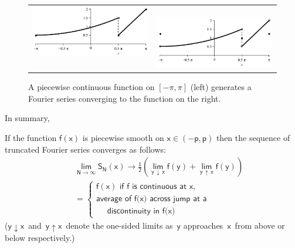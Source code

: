 \documentclass[12pt]{article}
\numberwithin{equation}{section}
\newenvironment{Framed}
  	{\begin{framed}
  		}
  	{\end{framed}}
\begin{document}
\begin{figure}[H]
\centering
\begin{tabular}{cc}
\includegraphics[scale=0.35]{Figs/cgence1.jpg}~~&~~\includegraphics[scale=0.35]{Figs/cgence2.jpg}
\end{tabular}
\caption{\small A piecewise continuous function on $[-\pi,\pi]$ (left) generates a Fourier series converging to the function on the right.}
\label{fig:cgence}
\end{figure}
In summary,
\begin{Framed}
	If the function $\mathsf{f(x)}$ is piecewise smooth on $\mathsf{x\in(-p, p)}$ then the
	sequence of truncated Fourier series converges as follows:
	\begin{eqnarray*}
	&&\mathsf{\lim_{N\to\infty}S_N(x)} \to \mathsf{ \frac{1}{2}\left(\lim_{y\,\downarrow\, x}f(y) + \lim_{y\,\uparrow\, x}f(y)\right)}\\
	&&= \left\{\begin{array}{l } \mathsf{f(x)} \,\, \textsf{if}\,\, \textsf{f}\, \,\textsf{is continuous
	at}\,\, \textsf{x},\\
	\textsf{average of}\,\, \textsf{f(x)}\,\,\textsf{across jump at a}\\
	\quad \textsf{ discontinuity in}\,\, \textsf{f(x)}
	\end{array}\right.
	\end{eqnarray*}
	($\mathsf{y \downarrow x}$\, \textsf{and}\, $\mathsf{y \uparrow x}$\, \textsf{denote the one-sided
	limits as}\, $\mathsf{y}$ \textsf{approaches}\, $\mathsf{x}$\, \textsf{from above or below respectively.)}
\end{Framed}
\end{document}

